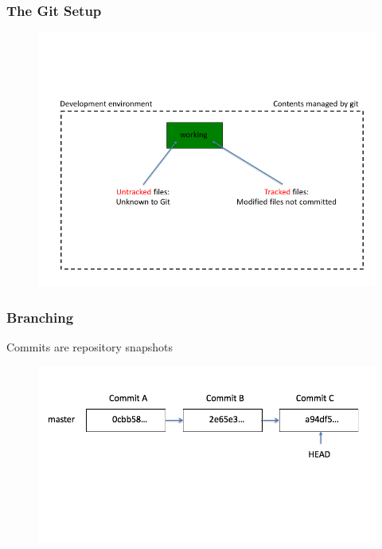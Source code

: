 \documentclass[11pt]{beamer}
\begin{document}

\begin{frame}[fragile]
\frametitle{The Git Setup}

\begin{figure}[htp]
 \centering
 \includegraphics[scale=0.35]{gitB.png}
\end{figure}




\end{frame}



\begin{frame}[fragile]
\frametitle{Branching}
Commits are repository snapshots
\begin{figure}[htp]
 \centering
 \includegraphics[scale=0.35]{branch1.png}
\end{figure}




\end{frame}
\end{document}
